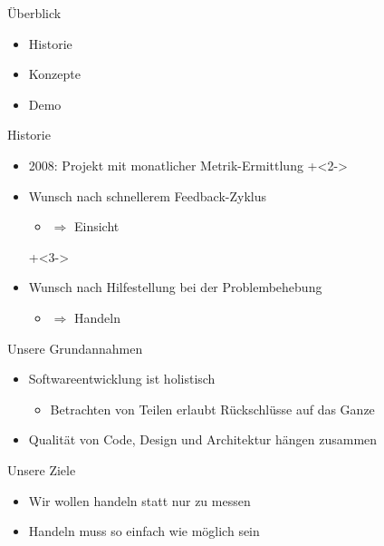 \begin{frame}[fragile]{Überblick}
\begin{itemize}
\item Historie
\item Konzepte
\item Demo
\end{itemize}
\end{frame}


\begin{frame}[fragile]{Historie}
\begin{itemize}
\item 2008: Projekt mit monatlicher Metrik-Ermittlung
\onslide+<2->
\item Wunsch nach schnellerem Feedback-Zyklus 
\begin{itemize}
\item $\Rightarrow$ Einsicht
\end{itemize}
\onslide+<3->
\item Wunsch nach Hilfestellung bei der Problembehebung 
\begin{itemize}
\item $\Rightarrow$ Handeln
\end{itemize}
\end{itemize}
\end{frame}

\begin{frame}[fragile]{Unsere Grundannahmen}

\begin{itemize}
\item Softwareentwicklung ist holistisch
\begin{itemize}
\item Betrachten von Teilen erlaubt Rückschlüsse auf das Ganze
\end{itemize}
\end{itemize}

\begin{itemize}
\item Qualität von Code, Design und Architektur hängen zusammen
\end{itemize}
\end{frame}

\begin{frame}[fragile]{Unsere Ziele}

\begin{itemize}
\item Wir wollen handeln statt nur zu messen
\item Handeln muss so einfach wie möglich sein
\end{itemize}

\end{frame}

